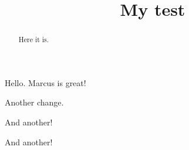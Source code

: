 \documentclass{ximera}
\title{My test}
\begin{document}
\begin{abstract}
  Here it is.
\end{abstract}
\maketitle

Hello. Marcus is great!

Another change.

And another!

And another!
\end{document}
